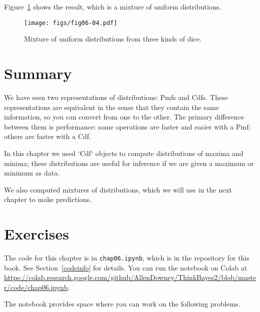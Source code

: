 \documentclass[12pt]{book}
\theoremstyle{exercise}
\newcommand{\py}[1]{{\tt #1}}%
\begin{document}
Figure~\ref{fig06-04} shows the result, which is a mixture of uniform distributions.

\begin{figure}
\centerline{\texttt{[image: figs/fig06-04.pdf]}}
\caption{Mixture of uniform distributions from three kinds of dice.}
\label{fig06-04}
\end{figure}



\section{Summary}


We have seen two representations of distributions: Pmfs and Cdfs.
These representations are equivalent in the sense that they contain
the same information, so you can convert from one to the other.  The
primary difference between them is performance: some operations are
faster and easier with a Pmf; others are faster with a Cdf.
 


In this chapter we used `Cdf` objects to compute distributions of maxima and minima; these distributions are useful for inference if we are given a maximum or minimum as data.

We also computed mixtures of distributions, which we will use in the next chapter to make predictions.


\section{Exercises}

The code for this chapter is in \py{chap06.ipynb}, which is in the repository for this book.  See Section~\ref{codeinfo} for details.
You can run the notebook on Colab at \url{https://colab.research.google.com/github/AllenDowney/ThinkBayes2/blob/master/code/chap06.ipynb}.

The notebook provides space where you can work on the following problems.
\end{document}
